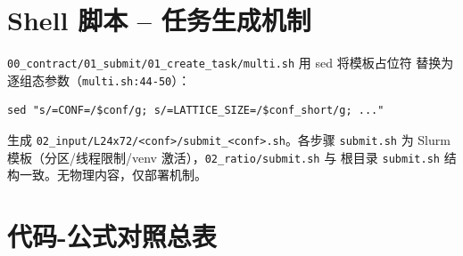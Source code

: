 \documentclass[UTF8]{ctexart}
\begin{document}
\section{Shell 脚本 -- 任务生成机制}

\texttt{00\_contract/01\_submit/01\_create\_task/multi.sh} 用 sed 将模板占位符
替换为逐组态参数（\texttt{multi.sh:44-50}）：
\begin{verbatim}
sed "s/=CONF=/$conf/g; s/=LATTICE_SIZE=/$conf_short/g; ..."
\end{verbatim}
生成 \texttt{02\_input/L24x72/<conf>/submit\_<conf>.sh}。各步骤 \texttt{submit.sh}
为 Slurm 模板（分区/线程限制/venv 激活），\texttt{02\_ratio/submit.sh} 与
根目录 \texttt{submit.sh} 结构一致。无物理内容，仅部署机制。

\section{代码-公式对照总表}
\end{document}
